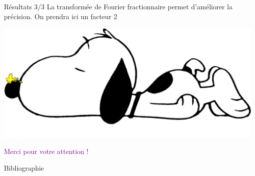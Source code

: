 \documentclass{beamer}
\begin{document}
\begin{frame}{Résultats 3/3}
    La transformée de Fourier fractionnaire permet d'améliorer la précision. On prendra ici un facteur 2
    \begin{center}
\end{center}
\begin{center}
\end{center}
\end{frame}



\begin{frame}
  \includegraphics[scale=0.3]{snoopy}
  \begin{center}
    \textcolor{purple}{\huge Merci pour votre attention !}
  \end{center}
\end{frame}

\begin{frame}{Bibliographie}
\nocite{FOURINT}
\nocite{FRAC}


\end{frame}
\end{document}
